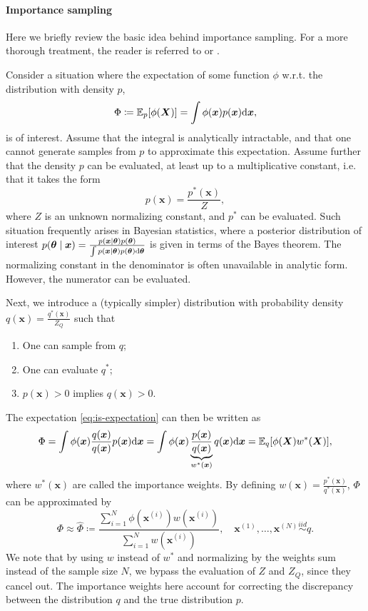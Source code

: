 \paragraph{Importance sampling}
Here we briefly review the basic idea behind importance sampling. For a more thorough treatment, the reader is referred to \cite{information-theory} or \cite{robert-casella}.

Consider a situation where the expectation of some function $\phi$ w.r.t. the distribution with density $p$,
\begin{equation} \label{eq:is-expectation}
\Phi \coloneqq \mathbb{E}_{p}[\phi(\bm{X})] = \int \phi(\bm{x}) p(\bm{x}) \mathrm{d}{\bm{x}},
\end{equation}
is of interest. Assume that the integral is analytically intractable, and that one cannot generate samples from $p$ to approximate this expectation. Assume further that the density $p$ can be evaluated, at least up to a multiplicative constant, i.e. that it takes the form
\begin{equation*}
p(\bm{x}) = \frac{p^*(\bm{x})}{Z},
\end{equation*}
where $Z$ is an unknown normalizing constant, and $p^*$ can be evaluated. Such situation frequently arises in Bayesian statistics, where a posterior distribution of interest $p(\bm{\theta} \mid \bm{x}) = \frac{p(\bm{x} \mid \bm{\theta}) p(\bm{\theta})}{\int p(\bm{x} \mid \bm{\theta}) p(\bm{\theta}) \mathrm{d}{\bm{\theta}}}$ is given in terms of the Bayes theorem. The normalizing constant in the denominator is often unavailable in analytic form. However, the numerator can be evaluated.

Next, we introduce a (typically simpler) distribution with probability density $q(\bm{x}) = \frac{q^*(\bm{x})}{Z_Q}$ such that
\begin{enumerate}
    \item One can sample from $q$;
    \item One can evaluate $q^*$;
    \item $p(\bm{x}) > 0$ implies $q(\bm{x}) > 0$.
\end{enumerate}
The expectation \eqref{eq:is-expectation} can then be written as
\begin{equation*}
\Phi = \int \phi(\bm{x}) \frac{q(\bm{x})}{q(\bm{x})} p(\bm{x}) \mathrm{d}{\bm{x}} = \int \phi(\bm{x}) \underbrace{\frac{p(\bm{x})}{q(\bm{x})}}_{w^*(\bm{x})} q(\bm{x}) \mathrm{d}{\bm{x}} = \mathbb{E}_{q}[\phi(\bm{X}) w^*(\bm{X})],
\end{equation*}
where $w^*(\bm{x})$ are called the importance weights. By defining $w(\bm{x}) = \frac{p^*(\bm{x})}{q^*(\bm{x})}$, $\Phi$ can be approximated by
\begin{equation*}
\Phi \approx \widehat{\Phi} \coloneqq \frac{\sum_{i=1}^N \phi(\bm{x}^{(i)}) w(\bm{x}^{(i)})}{\sum_{i=1}^Nw(\bm{x}^{(i)})}, \quad \bm{x}^{(1)}, \ldots, \bm{x}^{(N)} \stackrel{iid}{\sim} q.
\end{equation*}
We note that by using $w$ instead of $w^*$ and normalizing by the weights sum instead of the sample size $N$, we bypass the evaluation of $Z$ and $Z_Q$, since they cancel out. The importance weights here account for correcting the discrepancy between the distribution $q$ and the true distribution $p$.

